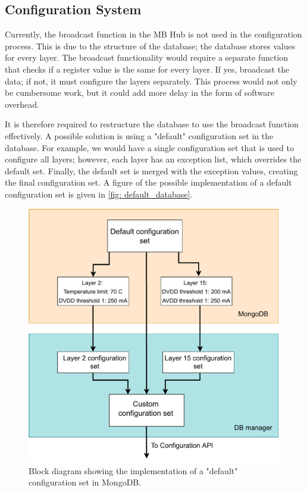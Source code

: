 \documentclass[main.tex]{subfiles}
\begin{document}
\subsection{Configuration System}

Currently, the broadcast function in the MB Hub is not used in the configuration process. This is due to the structure of the database; the database stores values for every layer. The broadcast functionality would require a separate function that checks if a register value is the same for every layer. If yes, broadcast the data; if not, it must configure the layers separately. This process would not only be cumbersome work, but it could add more delay in the form of software overhead.

It is therefore required to restructure the database to use the broadcast function effectively. A possible solution is using a "default" configuration set in the database. For example, we would have a single configuration set that is used to configure all layers; however, each layer has an exception list, which overrides the default set. Finally, the default set is merged with the exception values, creating the final configuration set. A figure of the possible implementation of a default configuration set is given in \autoref{fig: default_database}.


\begin{figure}[!ht]
    \centering
    \includegraphics[scale=0.55]{images/default_database.pdf}
    \caption{Block diagram showing the implementation of a "default" configuration set in MongoDB.}
    \label{fig: default_database}
\end{figure}
\FloatBarrier 
\end{document}

